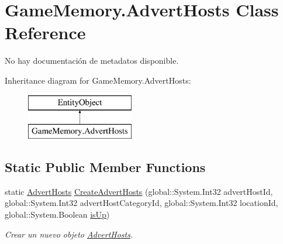 \hypertarget{class_game_memory_1_1_advert_hosts}{\section{Game\-Memory.\-Advert\-Hosts Class Reference}
\label{class_game_memory_1_1_advert_hosts}
}


No hay documentación de metadatos disponible.  


Inheritance diagram for Game\-Memory.\-Advert\-Hosts\-:\begin{figure}[H]
\begin{center}
\leavevmode
\includegraphics[height=2.000000cm]{class_game_memory_1_1_advert_hosts}
\end{center}
\end{figure}
\subsection*{Static Public Member Functions}
\begin{DoxyCompactItemize}
\item 
static \hyperlink{class_game_memory_1_1_advert_hosts}{Advert\-Hosts} \hyperlink{class_game_memory_1_1_advert_hosts_a9d7c2ea42590dcf01fb28977a6552417}{Create\-Advert\-Hosts} (global\-::\-System.\-Int32 advert\-Host\-Id, global\-::\-System.\-Int32 advert\-Host\-Category\-Id, global\-::\-System.\-Int32 location\-Id, global\-::\-System.\-Boolean \hyperlink{class_game_memory_1_1_advert_hosts_a8d5395f4cef95ff9558134b2c37feb6b}{is\-Up})
\begin{DoxyCompactList}\small\item\em Crear un nuevo objeto \hyperlink{class_game_memory_1_1_advert_hosts}{Advert\-Hosts}. \end{DoxyCompactList}\end{DoxyCompactItemize}
